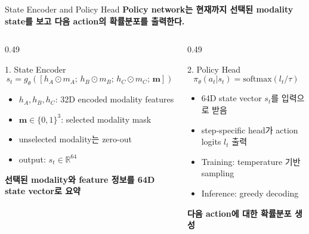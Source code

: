 \documentclass[11pt,notheorems,hyperref={pdfauthor=whatever}]{beamer}
\begin{document}
\begin{frame}[t]{State Encoder and Policy Head}
\small
\centering
\textbf{Policy network는 현재까지 선택된 modality state를 보고 다음 action의 확률분포를 출력한다.}
\vspace{0.55em}

\begin{columns}[T,onlytextwidth]
\begin{column}{0.49\textwidth}
\begin{block}{1. State Encoder}
\centering
{\large
\[
s_t =
g_\theta([h_A \odot m_A;\, h_B \odot m_B;\, h_C \odot m_C;\, \mathbf{m}])
\]
}
\vspace{-0.8em}
\footnotesize
\begin{itemize}
  \item \(h_A,h_B,h_C\): 32D encoded modality features
  \item \(\mathbf{m}\in\{0,1\}^3\): selected modality mask
  \item unselected modality는 zero-out
  \item output: \(s_t\in\mathbb{R}^{64}\)
\end{itemize}
\vspace{0.15em}
\textcolor{AccentOrange}{\textbf{선택된 modality와 feature 정보를 64D state vector로 요약}}
\end{block}
\end{column}

\begin{column}{0.49\textwidth}
\begin{block}{2. Policy Head}
\centering
{\Large
\[
\pi_\theta(a_t|s_t)=\mathrm{softmax}(l_t/\tau)
\]
}
\vspace{-0.8em}
\footnotesize
\begin{itemize}
  \item 64D state vector \(s_t\)를 입력으로 받음
  \item step-specific head가 action logits \(l_t\) 출력
  \item Training: temperature 기반 sampling
  \item Inference: greedy decoding
\end{itemize}
\vspace{0.15em}
\textcolor{AccentOrange}{\textbf{다음 action에 대한 확률분포 생성}}
\end{block}
\end{column}
\end{columns}

\end{frame}
\end{document}
